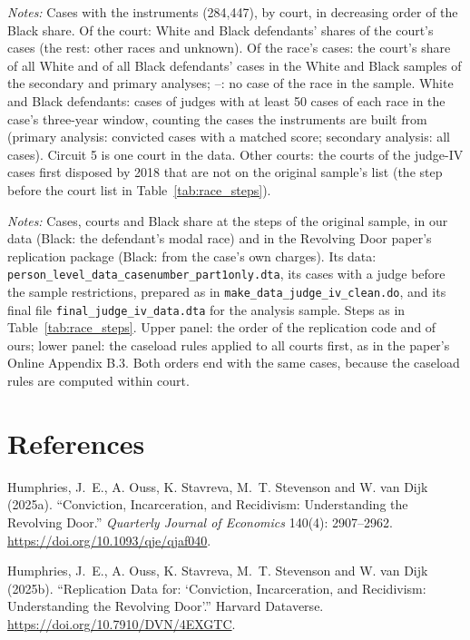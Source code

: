 \documentclass[11pt]{article}
\newcommand{\tabnote}[1]{\par\vspace{0.6ex}\begin{minipage}{\linewidth}\linespread{1}\footnotesize\textit{Notes:} #1\end{minipage}}
\newcommand{\racesamplenote}{White and Black defendants: cases of judges with at least 50 cases of each race in the case's three-year window, counting the cases the instruments are built from (primary analysis: convicted cases with a matched score; secondary analysis: all cases).}
\begin{document}
\begin{table}[H]
\centering
\caption{Race of the defendants by court}\label{tab:race_courts}
{\small\renewcommand{\arraystretch}{0.9}\resizebox{\textwidth}{!}{}}
\tabnote{Cases with the instruments (284,447), by court, in decreasing order of the Black share. Of the court: White and Black defendants' shares of the court's cases (the rest: other races and unknown). Of the race's cases: the court's share of all White and of all Black defendants' cases in the White and Black samples of the secondary and primary analyses; --: no case of the race in the sample. \racesamplenote{} Circuit 5 is one court in the data. Other courts: the courts of the judge-IV cases first disposed by 2018 that are not on the original sample's list (the step before the court list in Table~\ref{tab:race_steps}).}
\end{table}

\begin{table}[H]
\centering
\caption{Black share at each step: our data and the Revolving Door replication data}\label{tab:race_paper}
{\small\renewcommand{\arraystretch}{0.9}\resizebox{\textwidth}{!}{}}
\tabnote{Cases, courts and Black share at the steps of the original sample, in our data (Black: the defendant's modal race) and in the Revolving Door paper's replication package (Black: from the case's own charges). Its data: \texttt{person\_level\_\allowbreak data\_\allowbreak casenumber\_\allowbreak part1only.dta}, its cases with a judge before the sample restrictions, prepared as in \texttt{make\_data\_\allowbreak judge\_\allowbreak iv\_\allowbreak clean.do}, and its final file \texttt{final\_judge\_\allowbreak iv\_\allowbreak data.dta} for the analysis sample. Steps as in Table~\ref{tab:race_steps}. Upper panel: the order of the replication code and of ours; lower panel: the caseload rules applied to all courts first, as in the paper's Online Appendix B.3. Both orders end with the same cases, because the caseload rules are computed within court.}
\end{table}

\section*{References}
\begin{description}\setlength{\itemsep}{0pt}\small
  \item Humphries, J.~E., A. Ouss, K. Stavreva, M.~T. Stevenson and W. van Dijk (2025a). ``Conviction, Incarceration, and Recidivism: Understanding the Revolving Door.'' \emph{Quarterly Journal of Economics} 140(4): 2907--2962. \url{https://doi.org/10.1093/qje/qjaf040}.
  \item Humphries, J.~E., A. Ouss, K. Stavreva, M.~T. Stevenson and W. van Dijk (2025b). ``Replication Data for: `Conviction, Incarceration, and Recidivism: Understanding the Revolving Door'.'' Harvard Dataverse. \url{https://doi.org/10.7910/DVN/4EXGTC}.
\end{description}
\end{document}
